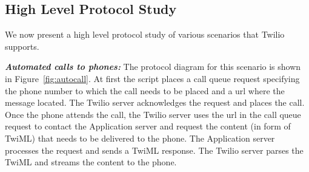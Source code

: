 \subsection{High Level Protocol Study}

We now present a high level protocol study of various scenarios that Twilio supports. 

\emph{\textbf{Automated calls to phones:} }
The protocol diagram for this scenario is shown in  Figure~\ref{fig:autocall}. At first the script places a call queue request specifying the phone number to which the call needs to be placed and a url where the message located. The Twilio server acknowledges the request and places the call. Once the phone attends the call, the Twilio server uses the url in the call queue request to contact the Application server and request the content (in form of TwiML) that needs to be delivered to the phone. The Application server processes the request and sends a TwiML response. The Twilio server parses the TwiML and streams the content to the phone.  



